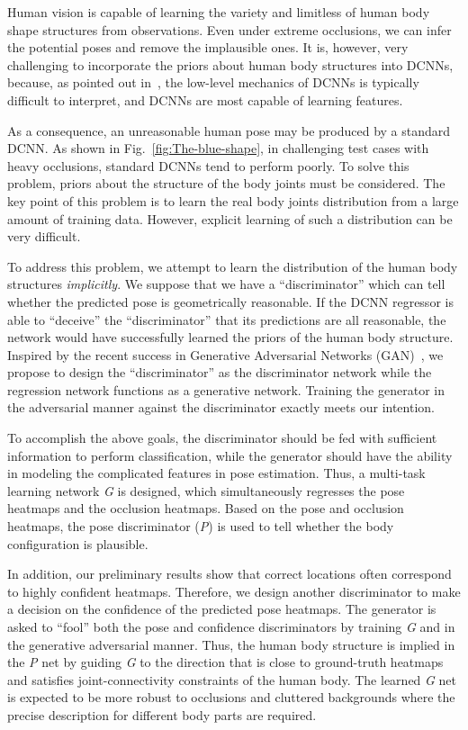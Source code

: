 \documentclass[10pt,letterpaper,twocolumn]{article}
\begin{document}
Human vision is capable of learning the variety and limitless of human body shape structures from observations. Even under extreme occlusions, we
can infer the potential poses and remove the implausible ones. It is, however, very challenging to incorporate the priors about human body structures into DCNNs, because, as pointed out in~\cite{conf/nips/TompsonJLB14}, the low-level mechanics of DCNNs is typically difficult to interpret, and DCNNs are most capable of learning features.

As a consequence, an unreasonable human pose may be produced by a standard DCNN. As shown in Fig.~\ref{fig:The-blue-shape}, in challenging test cases with heavy occlusions, standard DCNNs tend to perform poorly. To solve this problem, priors about the structure of the body joints must be considered. The key point of this problem is to learn the real body joints distribution from a large amount of training data. However, explicit learning of such a distribution can be very difficult.

To address this problem, we attempt to learn the distribution of the human body structures {\em implicitly}. We suppose that we have a ``discriminator'' which can tell whether the predicted pose is geometrically reasonable. If the DCNN regressor is able to ``deceive'' the ``discriminator'' that its predictions are all reasonable, the network would have successfully learned the priors of the human body structure. Inspired by the recent success in Generative Adversarial Networks (GAN)~\cite{journals/corr/RadfordMC15,journals/corr/ZhaoML16,conf/nips/SalimansGZCRCC16,conf/nips/GoodfellowPMXWOCB14,conf/nips/DentonCSF15}, we propose to design the ``discriminator'' as the discriminator network while the regression network functions as a generative network. Training the generator in the adversarial manner against the discriminator exactly meets our intention.

To accomplish the above goals, the discriminator should be fed with sufficient information to perform classification, while the generator should have the ability in modeling the complicated features in pose estimation. Thus, a multi-task learning network \textit{G} is designed, which simultaneously regresses the
pose heatmaps and the occlusion heatmaps. Based on the pose and occlusion heatmaps, the pose discriminator (\textit{P}) is used to tell whether the body configuration is plausible.

In addition, our preliminary results show that correct locations often correspond to highly confident heatmaps. Therefore, we design another discriminator to
make a decision on the confidence of the predicted pose heatmaps. The generator is asked to ``fool'' both the pose and confidence discriminators by training \textit{G} and  in the generative adversarial manner. Thus, the human body structure  is implied in the \textit{P} net by  guiding \textit{G} to the direction that is close to ground-truth heatmaps and satisfies joint-connectivity constraints of the human body. The learned \textit{G} net is expected to be more robust to occlusions and cluttered backgrounds where the precise description for different body parts are required.
\end{document}
